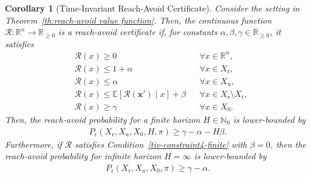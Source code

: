 \documentclass[journal,twoside,web]{ieeecolor}
\newcommand{\unsafe}{\mathrm{u}}
\newcommand{\safe}{\mathrm{s}}
\newcommand{\reach}{\mathrm{r}}
\newcommand{\px}{\mathbf{x}}
\newcommand{\reals}{\mathbb{R}}
\newcommand{\hor}{H}
\newcommand{\RA}{\mathcal{R}}
\newcommand{\Pfin}{P_{\reach}(X_{\reach}, X_u, X_0, \hor, \pi)}
\newcommand{\Pinf}{P_{\reach}(X_{\reach}, X_u, X_0, \pi)}
\theoremstyle{definition}
\theoremstyle{plain}
\newtheorem{corollary}[theorem]{Corollary}
\theoremstyle{plain}
\begin{document}
\begin{corollary}[Time-Invariant Reach-Avoid Certificate]
\label{col:reach-avoid time-invarying}
    Consider the setting in Theorem~\ref{th:reach-avoid value function}.
    Then, the continuous function $\RA : \mathbb{R}^n \to \mathbb{R}_{\geq 0}$ is a \emph{reach-avoid} certificate if, for constants $\alpha,\beta, \gamma \in \reals_{\geq 0}$, it satisfies 
    \begin{subequations}
        \begin{align}
            &\RA(x) \geq 0 && \forall x \in \mathbb{R}^n, \label{tiv-constraint1} \\
            &\RA(x) \leq 1 + \alpha && \forall x \in X_\reach,  \label{tiv-constraint2}\\
            &\RA(x) \leq \alpha && \forall x \in X_\unsafe,  \label{tiv-constraint3} \\
            &\RA(x) \leq \mathbb{E}[\RA(\px') \mid x] + \beta && \forall x \in X_\safe \setminus X_\reach, \label{tiv-constraint4-finite}\\
            &\RA(x) \geq \gamma && \forall x \in X_0.  \label{tiv-constraint5}
        \end{align}
    \end{subequations}
    Then, the  reach-avoid probability for a finite horizon $H \in \mathbb{N}_0$ is lower-bounded by
    \begin{align}
        \label{eq: probability bound for TI reach-avoid}
        \Pfin \geq \gamma - \alpha - \hor \beta.
    \end{align}  
    Furthermore, if $\RA$ satisfies Condition~\eqref{tiv-constraint4-finite} with $\beta = 0$,
        then the reach-avoid probability for infinite horizon $H = \infty$ is lower-bounded by
        \begin{align}
            \label{eq: probability bound for TI infinite reach-avoid}
            \Pinf \geq \gamma - \alpha.
        \end{align}
\end{corollary}
\end{document}

